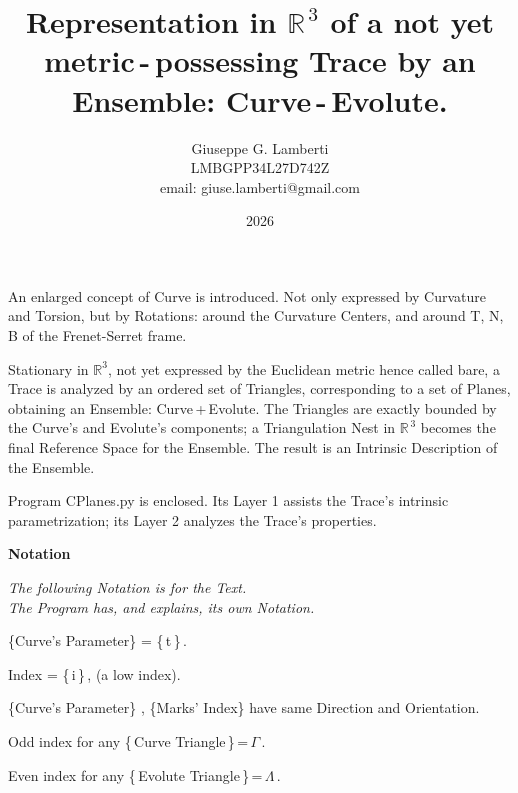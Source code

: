 \documentclass[12pt]{article} %
\renewenvironment{abstract}
 {\small
  \begin{center}
  \bfseries \abstractname\vspace{0.3em}
  \end{center}
  \list{}{%
    \setlength{\leftmargin}{3mm}
    \setlength{\rightmargin}{3mm}
  }%
  \item\relax}
 {\endlist}
\begin{document}
\title{\Large\textbf{Representation in $\mathbb{R}^{\,3}$ of a not yet metric\,-\,possessing Trace by an Ensemble: Curve\,-\,Evolute.}}          
\author{Giuseppe G. Lamberti\\
\small LMBGPP34L27D742Z\\
\small email: giuse.lamberti@gmail.com}
\date{2026}

\maketitle

\begin{abstract}
\begin{small}
\noindent An enlarged concept of Curve is introduced. Not only expressed by Curvature and Torsion, but by Rotations: around the Curvature Centers, and around T, N, B of the Frenet-Serret frame.

\noindent Stationary in $\mathbb{R}^{3}$, not yet expressed by the Euclidean metric hence called bare, a Trace is analyzed by an ordered set of Triangles, corresponding to a set of Planes, obtaining an Ensemble: Curve\,+\,Evolute. The Triangles are exactly bounded by the Curve's and Evolute's components; a Triangulation Nest in $\mathbb{R}^{\,3}$ becomes the final Reference Space for the Ensemble. The result is an Intrinsic Description of the Ensemble.

\noindent Program CPlanes.py is enclosed. Its Layer 1 assists the Trace's intrinsic parametrization; its Layer 2 analyzes the Trace's properties.      
\end{small}
\end{abstract}

\begin{center}
\bfseries{Notation}
\end{center}

\noindent \textsl{The following Notation is for the Text.\\ The Program has, and explains, its own Notation.} 

\noindent \{Curve's Parameter\} = \{\,t\,\}\,.

\noindent Index = \{\,i\,\}\,, (a low index).

\noindent \{Curve's Parameter\} , \{Marks' Index\} have same Direction and Orientation. 

\noindent Odd index\; for any \{\,Curve Triangle\,\}\,=\,$\Gamma$\,.

\noindent Even index\; for any \{\,Evolute Triangle\,\}\,=\,$\Lambda$\,.
\end{document}
